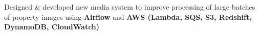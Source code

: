 \begin{cventries}
{\begin{cvitems}
        \item{Designed \& developed new media system to improve processing of large batches of property images using \textbf{Airflow} and \textbf{AWS (Lambda, SQS, S3, Redshift, DynamoDB, CloudWatch)}}
      \end{cvitems}
    }


\end{cventries}
